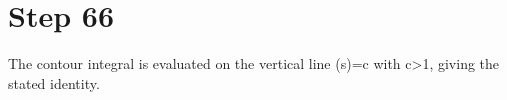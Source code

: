 \section*{Step 66}

The contour integral is evaluated on the vertical line \Re(s)=c with c>1, giving the stated identity.
